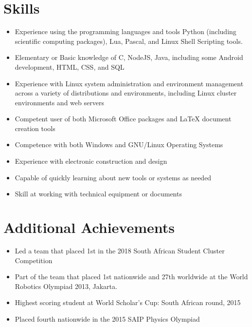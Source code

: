 \documentclass[12pt,a4paper,notitlepage]{article}
\begin{document}
\section*{Skills}
\begin{itemize}
    \item Experience using the programming languages and tools Python (including scientific computing packages), Lua, Pascal, and Linux Shell Scripting tools.
    \item Elementary or Basic knowledge of C, NodeJS, Java, including some Android development, HTML, CSS, and SQL
    \item Experience with Linux system administration and environment management across a variety of distributions and environments, including Linux cluster environments and web servers
    \item Competent user of both Microsoft Office packages and LaTeX document creation tools
    \item Competence with both Windows and GNU/Linux Operating Systems
    \item Experience with electronic construction and design
    \item Capable of quickly learning about new tools or systems as needed
    \item Skill at working with technical equipment or documents
\end{itemize}

\section*{Additional Achievements}
\begin{itemize}
    \item Led a team that placed 1st in the 2018 South African Student Cluster Competition
    \item Part of the team that placed 1st nationwide and 27th worldwide at the World Robotics Olympiad 2013, Jakarta.
    \item Highest scoring student at World Scholar's Cup: South African round, 2015
    \item Placed fourth nationwide in the 2015 SAIP Physics Olympiad
\end{itemize}
\end{document}
